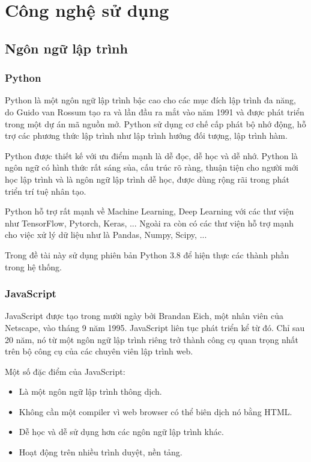 \chapter{Công nghệ sử dụng}

\section{Ngôn ngữ lập trình}

\subsection{Python}
Python là một ngôn ngữ lập trình bậc cao cho các mục đích lập trình
đa năng, do Guido van Rossum tạo ra và lần đầu ra mắt vào năm 1991
và được phát triển trong một dự án mã nguồn mở. Python sử dụng
cơ chế cấp phát bộ nhớ động, hỗ trợ các phương thức lập trình như
lập trình hướng đối tượng, lập trình hàm.

Python được thiết kế với ưu điểm mạnh là dễ đọc, dễ học và dễ nhớ.
Python là ngôn ngữ có hình thức rất sáng sủa, cấu trúc rõ ràng,
thuận tiện cho người mới học lập trình và là ngôn ngữ lập trình
dễ học, được dùng rộng rãi trong phát triển trí tuệ nhân tạo.

Python hỗ trợ rất mạnh về Machine Learning, Deep Learning với các
thư viện như TensorFlow, Pytorch, Keras, ... Ngoài ra còn có các
thư viện hỗ trợ mạnh cho việc xử lý dữ liệu như là Pandas, Numpy,
Scipy, ...

Trong đề tài này sử dụng phiên bản Python 3.8 để hiện thực các
thành phần trong hệ thống.

\subsection{JavaScript}
JavaScript được tạo trong mười ngày bởi Brandan Eich, một nhân viên
của Netscape, vào tháng 9 năm 1995. JavaScript liên tục phát triển
kể từ đó. Chỉ sau 20 năm, nó từ một ngôn ngữ lập trình riêng trở thành
công cụ quan trọng nhất trên bộ công cụ của các chuyên viên lập trình web.

Một số đặc điểm của JavaScript:

\begin{itemize}
    \item Là một ngôn ngữ lập trình thông dịch.
    \item Không cần một compiler vì web browser có thể biên dịch nó
    bằng HTML.
    \item Dễ học và dễ sử dụng hơn các ngôn ngữ lập trình khác.
    \item Hoạt động trên nhiều trình duyệt, nền tảng.
\end{itemize}


